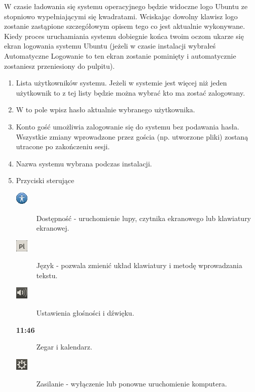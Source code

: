 W czasie ładowania się systemu operacyjnego będzie widoczne logo Ubuntu ze stopniowo wypełniającymi się kwadratami. Wciskając dowolny klawisz logo zostanie zastąpione szczegółowym opisem tego co jest aktualnie wykonywane.
Kiedy proces uruchamiania systemu dobiegnie końca twoim oczom ukarze się ekran logowania systemu Ubuntu (jeżeli w czasie instalacji wybrałeś \textcolor{ubuntu_orange}{Automatyczne Logowanie} to ten ekran zostanie pominięty i automatycznie zostaniesz przeniesiony do pulpitu).
\begin{enumerate}[label=\protect\circled{\arabic*}]
\item Lista użytkowników systemu. Jeżeli w systemie jest więcej niż jeden użytkownik to z tej listy będzie można wybrać kto ma zostać zalogowany.
\item W to pole wpisz hasło aktualnie wybranego użytkownika.
\item Konto gość umożliwia zalogowanie się do systemu bez podawania hasła. Wszystkie zmiany wprowadzone przez gościa (np. utworzone pliki) zostaną utracone po zakończeniu sesji.
\item Nazwa systemu wybrana podczas instalacji.
\item Przyciski sterujące
\begin{description}
\item[\includegraphics{images/ikony_dostempnosc.png}] \textcolor{ubuntu_orange}{Dostępność} - uruchomienie lupy, czytnika ekranowego lub klawiatury ekranowej.
\item[\includegraphics{images/ikony_jezyk.png}] \textcolor{ubuntu_orange}{Język} - pozwala zmienić układ klawiatury i metodę wprowadzania tekstu.
\item[\includegraphics{images/ikony_dzwiek.png}] \textcolor{ubuntu_orange}{Ustawienia głośności i dźwięku}.
\item[\textbf{11:46}] \textcolor{ubuntu_orange}{Zegar i kalendarz}.
\item[\includegraphics{images/ikony_zasilanie.png}] \textcolor{ubuntu_orange}{Zasilanie} - wyłączenie lub ponowne uruchomienie komputera.
\end{description}
\end{enumerate}
\clearpage
